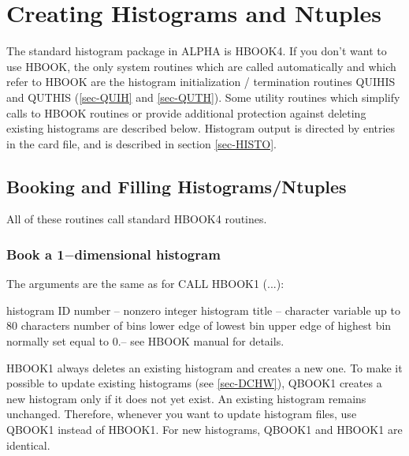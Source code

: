 \chapter{\label{sec-HIST}Creating Histograms and Ntuples}
\par
The standard histogram package in ALPHA is HBOOK4.
If you don't want to use
HBOOK, the only system routines which
are called automatically and
which refer to HBOOK are the histogram initialization / termination
routines QUIHIS and QUTHIS (\ref{sec-QUIH} and
\ref{sec-QUTH}).
Some utility routines which simplify calls to HBOOK
routines or provide additional protection
against deleting existing histograms are described below.
Histogram output is directed by entries in the card file,
and is described in section
\ref{sec-HISTO}.
 
\section{\label{sec-HBOOK}Booking and Filling Histograms/Ntuples}
\par
All of these routines call standard HBOOK4 routines.
\par
\subsection{\label{sec-QB1}Book a 1$-$dimensional histogram}
\par
{}
\par
\par The arguments
are the same as for CALL HBOOK1 (...):
\begin{indentlist}{ 2.50cm}{ 2.75cm}
histogram ID number -- nonzero integer
histogram title -- character variable up to 80 characters
number of bins
lower edge of lowest bin
upper edge of highest bin
normally set equal to 0.-- see HBOOK manual for details.
\end{indentlist}
 
\par
HBOOK1 always deletes an existing histogram and creates a new one.
To make it possible to update existing histograms
(see \ref{sec-DCHW}),
QBOOK1 creates a new histogram only if it does not yet exist.
An existing histogram remains unchanged. Therefore, whenever you want
to
update histogram files, use QBOOK1 instead of HBOOK1.
For new histograms, QBOOK1 and HBOOK1 are identical.
 
